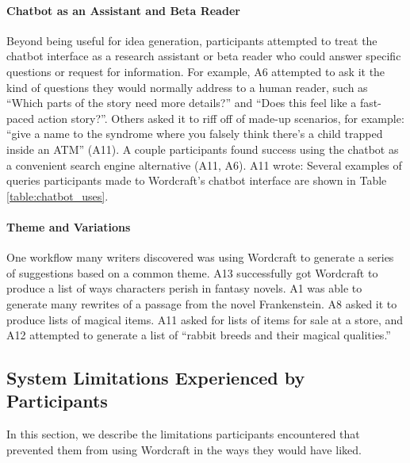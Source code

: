 \paragraph{Chatbot as an Assistant and Beta Reader}
Beyond being useful for idea generation, participants attempted to treat the chatbot interface as a research assistant or beta reader who could answer specific questions or request for information.
For example, A6 attempted to ask it the kind of questions they would normally address to a human reader, such as ``Which parts of the story need more details?'' and ``Does this feel like a fast-paced action story?''.
Others asked it to riff off of made-up scenarios, for example: ``give a name to the syndrome where you falsely think there’s a child trapped inside an ATM'' (A11).
A couple participants found success using the chatbot as a convenient search engine alternative (A11, A6).
A11 wrote: 
Several examples of queries participants made to Wordcraft's chatbot interface are shown in Table \ref{table:chatbot_uses}.

\paragraph{Theme and Variations}
One workflow many writers discovered was using Wordcraft to generate a series of suggestions based on a common theme.
A13 successfully got Wordcraft to produce a list of ways characters perish in fantasy novels.
A1 was able to generate many rewrites of a passage from the novel Frankenstein.
A8 asked it to produce lists of magical items.
A11 asked for lists of items for sale at a store, and A12 attempted to generate a list of ``rabbit breeds and their magical qualities.''

\subsection{System Limitations Experienced by Participants}
In this section, we describe the limitations participants encountered that prevented them from using Wordcraft in the ways they would have liked. 

